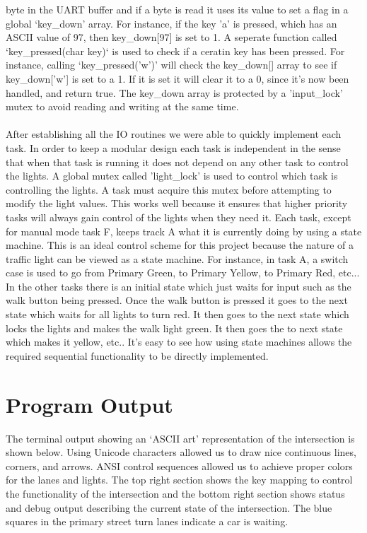 \documentclass[10pt]{article}
\begin{document}
byte in the UART buffer and if a byte is read it uses its value to set a flag in a
global `key\_down' array.  For instance, if the key 'a' is pressed, which has
an ASCII value of 97, then key\_down[97] is set to 1. A seperate function
called `key\_pressed(char key)` is used to check if a ceratin key has been
pressed. For instance, calling `key\_pressed('w')' will check the key\_down[]
array to see if key\_down['w'] is set to a 1. If it is set it will clear it to
a 0, since it's now been handled, and return true. The key\_down array is
protected by a 'input\_lock' mutex to avoid reading and writing at the same
time.  
\\\\ After establishing all the IO routines we were able to quickly
implement each task.  In order to keep a modular design each task is
independent in the sense that when that task is running it does not depend on
any other task to control the lights.  A global mutex called 'light\_lock' is
used to control which task is controlling the lights. A task must acquire this
mutex before attempting to modify the light values. This works well because it
ensures that higher priority tasks will always gain control of the lights when
they need it. Each task, except for manual mode task F, keeps track A what it
is currently doing by using a state machine. This is an ideal control scheme
for this project because the nature of a traffic light can be viewed as a state
machine. For instance, in task A, a switch case is used to go from Primary
Green, to Primary Yellow, to Primary Red, etc... In the other tasks there is an
initial state which just waits for input such as the walk button being pressed.
Once the walk button is pressed it goes to the next state which waits for all
lights to turn red. It then goes to the next state which locks the lights and
makes the walk light green. It then goes the to next state which makes it
yellow, etc.. It's easy to see how using state machines allows the required
sequential functionality to be directly implemented.

\newpage
\section*{Program Output}
The terminal output showing an `ASCII art' representation of the intersection
is shown below. Using Unicode characters allowed us to draw nice continuous
lines, corners, and arrows. ANSI control sequences allowed us to achieve proper
colors for the lanes and lights. The top right section shows the key mapping to
control the functionality of the intersection and the bottom right section
shows status and debug output describing the current state of the intersection.
The blue squares in the primary street turn lanes indicate a car is waiting.
\end{document}
